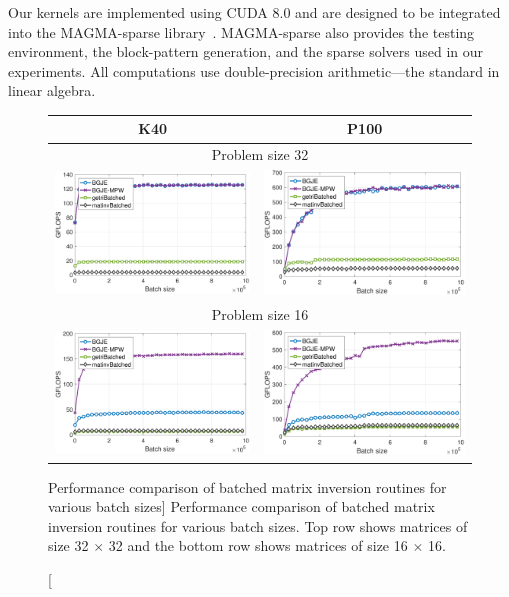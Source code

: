Our kernels are implemented using CUDA 8.0 and are designed to be integrated
into the MAGMA-sparse library~\cite{magma}. MAGMA-sparse also provides the
testing environment, the block-pattern generation, and the sparse solvers used
in our experiments. All computations use double-precision arithmetic---the
standard in linear algebra.

\begin{figure}[t]
\begin{center}
{\scriptsize
\begin{tabular}{cc}
K40 & P100\\
\hline
\multicolumn{2}{c}{Problem size 32}\\
\includegraphics[width=.46\columnwidth]{plots/gje_n_d_K40_32.pdf}&
\includegraphics[width=.46\columnwidth]{plots/gje_n_d_P100_32.pdf}\\
\hline
\multicolumn{2}{c}{Problem size 16}\\
\includegraphics[width=.46\columnwidth]{plots/gje_n_d_K40_16.pdf}&
\includegraphics[width=.46\columnwidth]{plots/gje_n_d_P100_16.pdf}
\end{tabular}
}
\end{center}
\caption
[Performance comparison of batched matrix inversion routines for various batch
sizes]
{
Performance comparison of batched matrix inversion routines for various batch sizes. 
Top row shows matrices of size 32 $\times$ 32 and the bottom row shows matrices of size 16 $\times$ 16.
}
\label{2017-gje-block-jacobi:fig:bgje-mpw-performance}
\end{figure}

